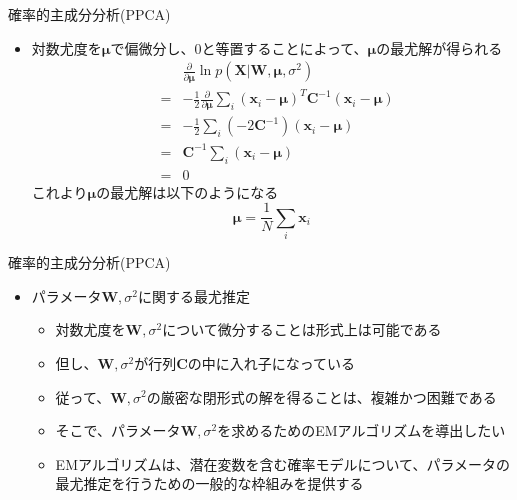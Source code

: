 \documentclass[dvipdfmx,notheorems,t]{beamer}
\begin{document}
\begin{frame}{確率的主成分分析(PPCA)}
\begin{itemize}
\begin{itemize}
		\item 対数尤度を$\bm{\mu}$で偏微分し、$0$と等置することによって、$\bm{\mu}$の最尤解が得られる
		\begin{eqnarray}
			&& \frac{\partial}{\partial \bm{\mu}} \ln p(\bm{X} | \bm{W}, \bm{\mu}, \sigma^2) \nonumber \\
			&=& -\frac{1}{2} \frac{\partial}{\partial \bm{\mu}} \sum_i \left( \bm{x}_i - \bm{\mu} \right)^T \bm{C}^{-1} \left( \bm{x}_i - \bm{\mu} \right) \nonumber \\
			&=& -\frac{1}{2} \sum_i \left( -2 \bm{C}^{-1} \right) \left( \bm{x}_i - \bm{\mu} \right) \nonumber \\
			&=& \bm{C}^{-1} \sum_i \left( \bm{x}_i - \bm{\mu} \right) \nonumber \\
			&=& 0 \nonumber
		\end{eqnarray}
		これより$\bm{\mu}$の最尤解は以下のようになる
		\begin{equation}
			\bm{\mu} = \frac{1}{N} \sum_i \bm{x}_i
		\end{equation}
	\end{itemize}
\end{itemize}

\end{frame}

\begin{frame}{確率的主成分分析(PPCA)}

\begin{itemize}
	\item パラメータ$\bm{W}, \sigma^2$に関する最尤推定
	\begin{itemize}
		\item 対数尤度を$\bm{W}, \sigma^2$について微分することは形式上は可能である
		\item 但し、$\bm{W}, \sigma^2$が行列$\bm{C}$の中に入れ子になっている
		\item 従って、$\bm{W}, \sigma^2$の厳密な閉形式の解を得ることは、複雑かつ困難である
		\newline
		
		\item そこで、パラメータ$\bm{W}, \sigma^2$を求めるための\alert{EMアルゴリズム}を導出したい
		\newline
		
		\item EMアルゴリズムは、潜在変数を含む確率モデルについて、パラメータの最尤推定を行うための一般的な枠組みを提供する
	\end{itemize}
\end{itemize}

\end{frame}
\end{document}
